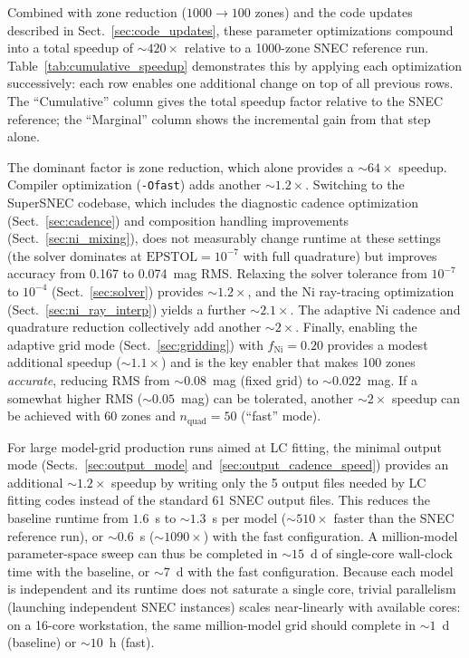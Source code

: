 \documentclass[twocolumn,linenumbers]{aastex701}
\begin{document}
Combined with zone reduction ($1000 \to 100$ zones) and the code updates described in Sect.~\ref{sec:code_updates}, these parameter optimizations compound into a total speedup of ${\sim}420\times$ relative to a 1000-zone SNEC reference run. Table~\ref{tab:cumulative_speedup} demonstrates this by applying each optimization successively: each row enables one additional change on top of all previous rows. The ``Cumulative'' column gives the total speedup factor relative to the SNEC reference; the ``Marginal'' column shows the incremental gain from that step alone. %



The dominant factor is zone reduction, which alone provides a ${\sim}64\times$ speedup. Compiler optimization (\texttt{-Ofast}) adds another ${\sim}1.2\times$. Switching to the SuperSNEC codebase, which includes the diagnostic cadence optimization (Sect.~\ref{sec:cadence}) and composition handling improvements (Sect.~\ref{sec:ni_mixing}), does not measurably change runtime at these settings (the solver dominates at $\mathrm{EPSTOL}=10^{-7}$ with full quadrature) but improves accuracy from 0.167 to 0.074~mag RMS. Relaxing the solver tolerance from $10^{-7}$ to $10^{-4}$ (Sect.~\ref{sec:solver}) provides ${\sim}1.2\times$, and the Ni ray-tracing optimization (Sect.~\ref{sec:ni_ray_interp}) yields a further ${\sim}2.1\times$. The adaptive Ni cadence and quadrature reduction collectively add another ${\sim}2\times$. Finally, enabling the adaptive grid mode (Sect.~\ref{sec:gridding}) with $f_{\mathrm{Ni}} = 0.20$ provides a modest additional speedup (${\sim}1.1\times$) and is the key enabler that makes 100 zones \emph{accurate}, reducing RMS from ${\sim}0.08$~mag (fixed grid) to ${\sim}0.022$~mag. If a somewhat higher RMS (${\sim}0.05$~mag) can be tolerated, another ${\sim}2\times$ speedup can be achieved with 60 zones and $n_\mathrm{quad} = 50$ (``fast'' mode).

For large model-grid production runs aimed at LC fitting, the minimal output mode (Sects.~\ref{sec:output_mode} and~\ref{sec:output_cadence_speed}) provides an additional ${\sim}1.2\times$ speedup by writing only the 5 output files needed by LC fitting codes instead of the standard 61 SNEC output files. This reduces the baseline runtime from $1.6$~s to ${\sim}1.3$~s per model (${\sim}510\times$ faster than the SNEC reference run), or ${\sim}0.6$~s (${\sim}1090\times$) with the fast configuration. A million-model parameter-space sweep can thus be completed in ${\sim}15$~d of single-core wall-clock time with the baseline, or ${\sim}7$~d with the fast configuration. Because each model is independent and its runtime does not saturate a single core, trivial parallelism (launching independent SNEC instances) scales near-linearly with available cores: on a 16-core workstation, the same million-model grid should complete in ${\sim}1$~d (baseline) or ${\sim}10$~h (fast).
\end{document}
